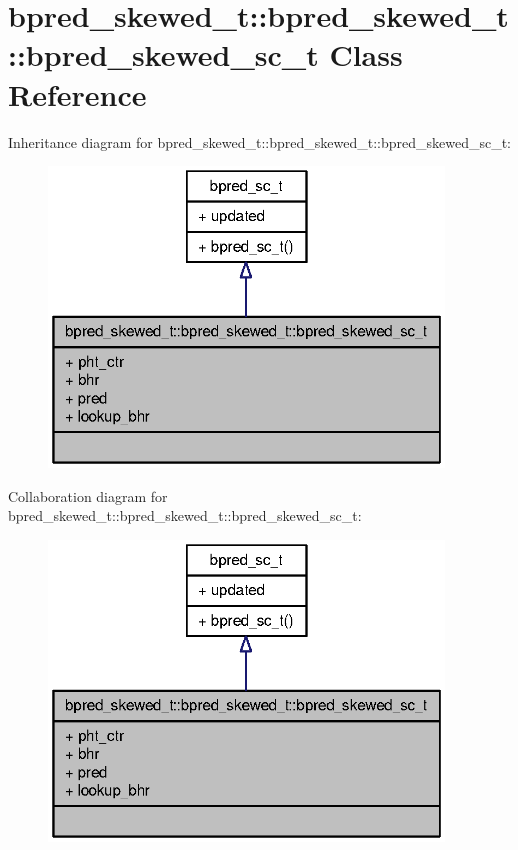 \section{bpred\_\-skewed\_\-t::bpred\_\-skewed\_\-t::bpred\_\-skewed\_\-sc\_\-t Class Reference}
\label{classbpred__skewed__t_1_1bpred__skewed__sc__t}
Inheritance diagram for bpred\_\-skewed\_\-t::bpred\_\-skewed\_\-t::bpred\_\-skewed\_\-sc\_\-t:\nopagebreak
\begin{figure}[H]
\begin{center}
\leavevmode
\includegraphics[width=298pt]{classbpred__skewed__t_1_1bpred__skewed__sc__t__inherit__graph}
\end{center}
\end{figure}
Collaboration diagram for bpred\_\-skewed\_\-t::bpred\_\-skewed\_\-t::bpred\_\-skewed\_\-sc\_\-t:\nopagebreak
\begin{figure}[H]
\begin{center}
\leavevmode
\includegraphics[width=298pt]{classbpred__skewed__t_1_1bpred__skewed__sc__t__coll__graph}
\end{center}
\end{figure}
